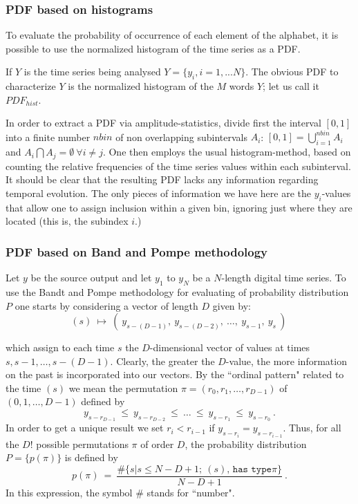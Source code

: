 \subsubsection{PDF based on histograms}

To evaluate the probability of occurrence of each element of the alphabet, it is possible to use the normalized histogram of the time series as a PDF.

If $Y$ is the time series being analysed $Y=\{y_i,i=1,...N\}$. The obvious PDF to characterize $Y$ is the normalized histogram of the $M$ words $Y$; let us call it  $PDF_{hist}$.
 
In order to  extract a PDF via amplitude-statistics, divide first
the interval $[0,1]$ into a finite number $nbin$ of non
overlapping subintervals $A_i$: $[0,1]=\bigcup_{i=1}^{nbin} A_i$
and $A_i\bigcap A_j=\emptyset~\forall i\neq j$. One then employs
the usual histogram-method, based on counting the relative
frequencies of the time series values within each subinterval. It
should be clear that the resulting  PDF lacks any information
regarding temporal evolution. The only pieces of information we
have here are the $y_i$-values that allow one to assign inclusion
within a given bin, ignoring just where they are located (this is,
the subindex $i$.)

\subsubsection{PDF based on Band and Pompe methodology}
%
Let $y$ be the source output and let $y_1$ to $y_N$ be a $N$-length digital time series.
To use the Bandt and Pompe \cite{Pompe2002} methodology for evaluating
of probability distribution $P$ one starts by  considering
a vector of length $D$ given by: 
\begin{equation}
(s)~\mapsto~
\left(~y_{s-(D-1)},~y_{s-(D-2)},~\dots,~y_{s-1},~y_{s}~\right) \,
 \label{eq:vectores}
\end{equation}

which assign to each time $s$ the $D$-dimensional vector of values
at times $s, s-1,\dots,s-(D-1)$. Clearly, the greater the
$D$-value, the more information on the past  is incorporated into
our vectors. By the ``ordinal pattern" related to the time $(s)$
we mean the permutation $\pi=(r_0,r_1, \dots,r_{D-1})$ of
$(0,1,\dots,D-1)$ defined by
\begin{equation}
y_{s-r_{D-1}}~\le~y_{s-r_{D-2}}~\le~\dots~\le~y_{s-r_{1}}~\le~y_{s-r_0}
\ . \label{eq:permuta}
\end{equation}
In order to get a unique result we set $r_i <r_{i-1}$ if
$y_{s-r_{i}}=y_{s-r_{i-1}}$. Thus, for all the $D!$ possible
permutations $\pi$ of order $D$, the probability distribution
$P=\{p(\pi)\}$ is defined by
\begin{equation}
p(\pi)~=~\frac{\# \{s|s\leq N-D+1;~ (s) \texttt{, has type
}\pi\}}{N-D+1} \ . \label{eq:frequ}
\end{equation}
In this expression, the symbol $\#$ stands for ``number".

